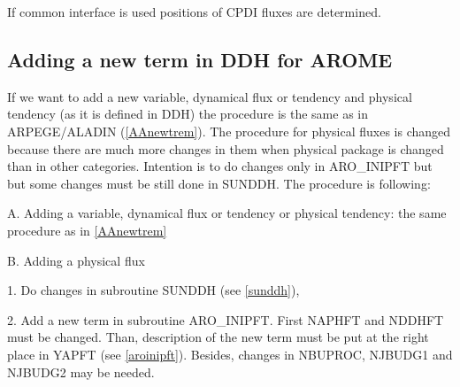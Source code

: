 If common interface is used positions of CPDI fluxes are determined.



\subsection{Adding a new term in DDH for AROME}
If we want to add a new variable, dynamical flux or tendency and physical tendency (as it is defined in DDH) the procedure is the same as in ARPEGE/ALADIN (\ref {AAnewtrem}). The procedure for physical fluxes is changed because there are much more changes in them when physical package is changed than in other categories. Intention is to do changes only in ARO\_INIPFT but but some changes must be still done in SUNDDH. The procedure is following:
\begin{description}
\item{A. }Adding a variable, dynamical flux or tendency or physical tendency: the same procedure as in \ref {AAnewtrem}

\item{B. }Adding a physical flux
\begin{description}
\item{1. } Do changes in subroutine SUNDDH (see \ref{sunddh}),
\item{2. } Add a new term in subroutine ARO\_INIPFT. First NAPHFT and NDDHFT must be changed. Than, description of the new term must be put at the right place in YAPFT (see \ref{aroinipft}). Besides, changes in NBUPROC, NJBUDG1 and NJBUDG2 may be needed.

\end{description}

\end{description}

